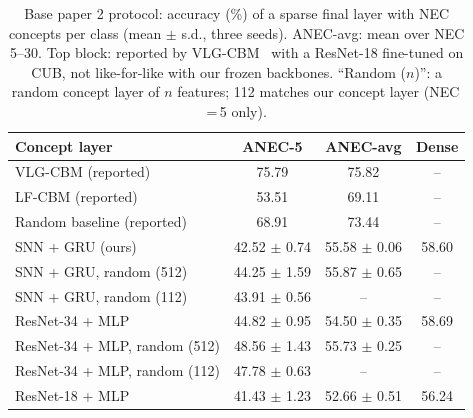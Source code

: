 \documentclass[conference]{IEEEtran}
\begin{document}
\begin{table}[t]
\caption{Base paper 2 protocol: accuracy (\%) of a sparse final layer with NEC concepts per class (mean $\pm$ s.d., three seeds). ANEC-avg: mean over NEC 5--30. Top block: reported by VLG-CBM~\cite{srivastava2024vlgcbm} with a ResNet-18 fine-tuned on CUB, not like-for-like with our frozen backbones. ``Random ($n$)'': a random concept layer of $n$ features; 112 matches our concept layer (NEC\,=\,5 only).}
\label{tab:nec}
\centering
\footnotesize
\setlength{\tabcolsep}{3pt}
\begin{tabular}{@{}lccc@{}}
\toprule
Concept layer & ANEC-5 & ANEC-avg & Dense \\
\midrule
VLG-CBM (reported) & 75.79 & 75.82 & -- \\
LF-CBM (reported) & 53.51 & 69.11 & -- \\
Random baseline (reported) & 68.91 & 73.44 & -- \\
\midrule
SNN + GRU (ours) & 42.52 $\pm$ 0.74 & 55.58 $\pm$ 0.06 & 58.60 \\
SNN + GRU, random (512) & 44.25 $\pm$ 1.59 & 55.87 $\pm$ 0.65 & -- \\
SNN + GRU, random (112) & 43.91 $\pm$ 0.56 & -- & -- \\
ResNet-34 + MLP & 44.82 $\pm$ 0.95 & 54.50 $\pm$ 0.35 & 58.69 \\
ResNet-34 + MLP, random (512) & 48.56 $\pm$ 1.43 & 55.73 $\pm$ 0.25 & -- \\
ResNet-34 + MLP, random (112) & 47.78 $\pm$ 0.63 & -- & -- \\
ResNet-18 + MLP & 41.43 $\pm$ 1.23 & 52.66 $\pm$ 0.51 & 56.24 \\
\bottomrule
\end{tabular}
\end{table}
\end{document}
